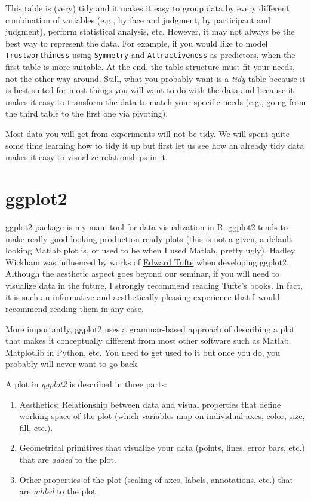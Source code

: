 \documentclass[
]{book}
\providecommand{\tightlist}{%
  \setlength{\itemsep}{0pt}\setlength{\parskip}{0pt}}
\begin{document}
This table is (very) tidy and it makes it easy to group data by every different combination of variables (e.g., by face and judgment, by participant and judgment), perform statistical analysis, etc. However, it may not always be the best way to represent the data. For example, if you would like to model \texttt{Trustworthiness} using \texttt{Symmetry} and \texttt{Attractiveness} as predictors, when the first table is more suitable. At the end, the table structure must fit your needs, not the other way around. Still, what you probably want is a \emph{tidy} table because it is best suited for most things you will want to do with the data and because it makes it easy to transform the data to match your specific needs (e.g., going from the third table to the first one via pivoting).

Most data you will get from experiments will not be tidy. We will spent quite some time learning how to tidy it up but first let us see how an already tidy data makes it easy to visualize relationships in it.

\hypertarget{ggplot2-1}{%
\section{ggplot2}\label{ggplot2-1}}

\href{https://ggplot2.tidyverse.org/}{ggplot2} package is my main tool for data visualization in R. ggplot2 tends to make really good looking production-ready plots (this is not a given, a default-looking Matlab plot is, or used to be when I used Matlab, pretty ugly). Hadley Wickham was influenced by works of \href{https://www.edwardtufte.com/tufte/}{Edward Tufte} when developing ggplot2. Although the aesthetic aspect goes beyond our seminar, if you will need to visualize data in the future, I strongly recommend reading Tufte's books. In fact, it is such an informative and aesthetically pleasing experience that I would recommend reading them in any case.

More importantly, ggplot2 uses a grammar-based approach of describing a plot that makes it conceptually different from most other software such as Matlab, Matplotlib in Python, etc. You need to get used to it but once you do, you probably will never want to go back.

A plot in \emph{ggplot2} is described in three parts:

\begin{enumerate}
\def\labelenumi{\arabic{enumi}.}
\tightlist
\item
  Aesthetics: Relationship between data and visual properties that define working space of the plot (which variables map on individual axes, color, size, fill, etc.).
\item
  Geometrical primitives that visualize your data (points, lines, error bars, etc.) that are \emph{added} to the plot.
\item
  Other properties of the plot (scaling of axes, labels, annotations, etc.) that are \emph{added} to the plot.
\end{enumerate}
\end{document}

